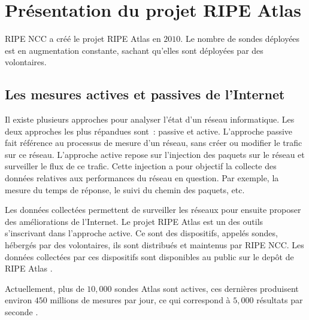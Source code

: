 \section{Présentation du projet RIPE Atlas } \label{ripeatlassection}

RIPE NCC a créé le projet RIPE Atlas en $2010$. Le nombre de sondes déployées est en augmentation constante, sachant qu'elles sont déployées par des volontaires.

\subsection{Les mesures  actives et passives de l'Internet}

Il existe plusieurs approches pour analyser l'état  d'un réseau informatique. Les deux approches les plus répandues sont~:   passive et active. L'approche passive fait référence au processus de mesure d'un réseau, sans créer ou modifier le trafic sur ce réseau.   L'approche active  repose sur l'injection des paquets  sur le réseau et surveiller le flux de ce trafic. Cette injection a pour objectif la collecte  des données relatives aux performances du réseau en question. Par exemple, la mesure du temps de réponse, le suivi du chemin des paquets, etc. 

Les données collectées permettent de surveiller les réseaux pour ensuite  proposer des améliorations de l'Internet. Le projet RIPE Atlas est un des outils s'inscrivant dans l'approche active. Ce sont  des dispositifs, appelés sondes, hébergés par des volontaires, ils sont distribués et maintenus par  RIPE NCC. Les données collectées par ces dispositifs sont disponibles au public sur le depôt de RIPE Atlas \cite{ripe-atlas-data}.

Actuellement,  plus de $10,000$ sondes Atlas sont actives, ces dernières produisent environ $450$ millions de mesures par jour, ce qui correspond à  $5,000$ résultats par seconde \cite{WinNT}.


